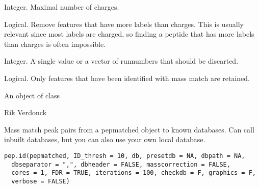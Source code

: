 \documentclass[letterpaper]{book}
\begin{document}
\begin{Arguments}
\begin{ldescription}
\item[\code{zmax}] Integer. Maximal number of charges.

\item[\code{remove.more.labels.than.charges}] Logical. Remove features that have more labels than charges. This is usually relevant since most labels are charged, so finding a peptide that has more labels than charges is often impossible.

\item[\code{remove.run}] Integer. A single value or a vector of runnumbers that should be discarted.

\item[\code{only.identified}] Logical. Only features that have been identified with mass match are retained.
\end{ldescription}
\end{Arguments}
%
\begin{Value}
An object of class 
\end{Value}
%
\begin{Author}\relax
Rik Verdonck
\end{Author}
%
\begin{SeeAlso}\relax
{} 
\end{SeeAlso}
%
\begin{Description}\relax
Mass match peak pairs from a pepmatched object to known databases. Can call inbuilt databases, but you can also use your own local database.
\end{Description}
%
\begin{Usage}
\begin{verbatim}
pep.id(pepmatched, ID_thresh = 10, db, presetdb = NA, dbpath = NA,
  dbseparator = ",", dbheader = FALSE, masscorrection = FALSE,
  cores = 1, FDR = TRUE, iterations = 100, checkdb = F, graphics = F,
  verbose = FALSE)
\end{verbatim}
\end{Usage}
%
\end{document}
